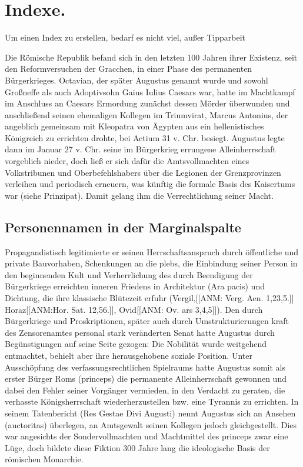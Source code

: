 
\chapter{Indexe.} 
Um einen Index zu erstellen, bedarf es nicht viel, außer Tipparbeit

Die Römische Republik befand sich in den letzten 100 Jahren ihrer Existenz, seit den Reformversuchen der Gracchen, in einer Phase des permanenten Bürgerkrieges. Octavian, der später Augustus genannt wurde und sowohl Großneffe als auch Adoptivsohn Gaius Iulius Caesars war, hatte im Machtkampf im Anschluss an Caesars Ermordung zunächst dessen Mörder überwunden und anschließend seinen ehemaligen Kollegen im Triumvirat, Marcus Antonius, der angeblich gemeinsam mit Kleopatra von Ägypten aus ein hellenistisches Königreich zu errichten drohte, bei Actium 31 v. Chr. besiegt. Augustus legte dann im Januar 27 v. Chr. seine im Bürgerkrieg errungene Alleinherrschaft vorgeblich nieder, doch ließ er sich dafür die Amtsvollmachten eines Volkstribunen und Oberbefehlshabers über die Legionen der Grenzprovinzen verleihen und periodisch erneuern, was künftig die formale Basis des Kaisertums war (siehe Prinzipat). Damit gelang ihm die Verrechtlichung seiner Macht.

\section{Personennamen in der Marginalspalte}



Propagandistisch legitimierte er seinen Herrschaftsanspruch durch öffentliche und private Bauvorhaben, Schenkungen an die plebs, die Einbindung seiner Person in den beginnenden Kult und Verherrlichung des durch Beendigung der Bürgerkriege erreichten inneren Friedens in Architektur (Ara pacis) und Dichtung, die ihre klassische Blütezeit erfuhr (Vergil,[[ANM: Verg. Aen. 1,23,5.]]  Horaz[[ANM:Hor. Sat. 12,56.]], Ovid[[ANM: Ov. ars 3,4,5]]). Den durch Bürgerkriege und Proskriptionen, später auch durch Umstrukturierungen kraft des Zensorenamtes personal stark veränderten Senat hatte Augustus durch Begünstigungen auf seine Seite gezogen: Die Nobilität wurde weitgehend entmachtet, behielt aber ihre herausgehobene soziale Position. Unter Ausschöpfung des verfassungsrechtlichen Spielraums hatte Augustus somit als erster Bürger Roms (princeps) die permanente Alleinherrschaft gewonnen und dabei den Fehler seiner Vorgänger vermieden, in den Verdacht zu geraten, die verhasste Königsherrschaft wiederherzustellen bzw. eine Tyrannis zu errichten. In seinem Tatenbericht (Res Gestae Divi Augusti) nennt Augustus sich an Ansehen (auctoritas) überlegen, an Amtsgewalt seinen Kollegen jedoch gleichgestellt. Dies war angesichts der Sondervollmachten und Machtmittel des princeps zwar eine Lüge, doch bildete diese Fiktion 300 Jahre lang die ideologische Basis der römischen Monarchie.

